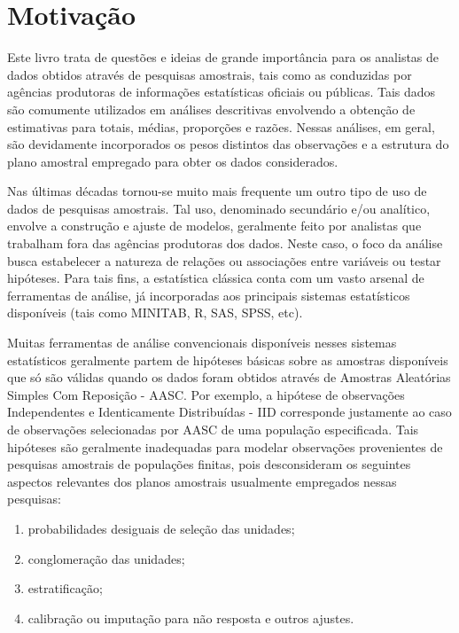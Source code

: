 \documentclass[
  12pt,
  brazilian,
]{book}
\theoremstyle{definition}
\theoremstyle{definition}
\theoremstyle{definition}
\theoremstyle{definition}
\theoremstyle{remark}
\begin{document}
\hypertarget{motivauxe7uxe3o}{%
\section{Motivação}\label{motivauxe7uxe3o}}

Este livro trata de questões e ideias de grande importância para os analistas de dados obtidos através de pesquisas amostrais, tais como as conduzidas por agências produtoras de informações estatísticas oficiais ou públicas. Tais dados são comumente utilizados em análises descritivas envolvendo a obtenção de estimativas para totais, médias, proporções e razões. Nessas análises, em geral, são devidamente incorporados os pesos distintos das observações e a estrutura do plano amostral empregado para obter os dados considerados.

Nas últimas décadas tornou-se muito mais frequente um outro tipo de uso de dados de pesquisas amostrais. Tal uso, denominado secundário e/ou analítico, envolve a construção e ajuste de modelos, geralmente feito por analistas que trabalham fora das agências produtoras dos dados. Neste caso, o foco da análise busca estabelecer a natureza de relações ou associações entre variáveis ou testar hipóteses. Para tais fins, a estatística clássica conta com um vasto arsenal de ferramentas de análise, já incorporadas aos principais sistemas estatísticos disponíveis (tais como MINITAB, R, SAS, SPSS, etc).

Muitas ferramentas de análise convencionais disponíveis nesses sistemas estatísticos geralmente partem de hipóteses básicas sobre as amostras disponíveis que só são válidas quando os dados foram obtidos através de Amostras Aleatórias Simples Com Reposição - AASC. Por exemplo, a hipótese de observações Independentes e Identicamente Distribuídas - IID corresponde justamente ao caso de observações selecionadas por AASC de uma população especificada. Tais hipóteses são geralmente inadequadas para modelar observações provenientes de pesquisas amostrais de populações finitas, pois desconsideram os seguintes aspectos relevantes dos planos amostrais usualmente empregados nessas pesquisas:

\begin{enumerate}
\def\labelenumi{\roman{enumi}.}
\item
  probabilidades desiguais de seleção das unidades;
\item
  conglomeração das unidades;
\item
  estratificação;
\item
  calibração ou imputação para não resposta e outros ajustes.
\end{enumerate}
\end{document}
